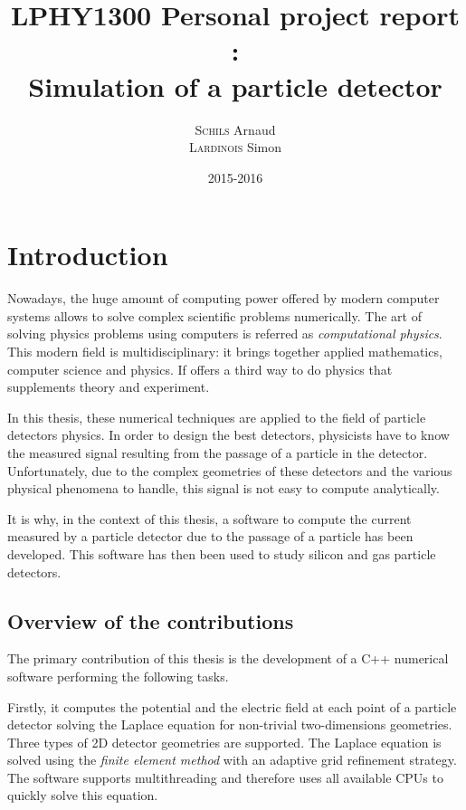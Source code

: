 \documentclass[11pt]{article}
\title{LPHY1300 Personal project report :\\ Simulation of a particle detector}
\author{\textsc{Schils} Arnaud\\ \textsc{Lardinois} Simon}
\date{2015-2016}
\begin{document}
\maketitle
\newpage
\renewcommand{\contentsname}{Table of contents}
\tableofcontents




\newpage
\section*{Introduction}

Nowadays, the huge amount of computing power offered by modern computer systems allows
to solve complex scientific problems numerically. The art of solving physics problems using
computers is referred as \textit{computational physics}. This modern field
is multidisciplinary: it brings together applied mathematics,
computer science and physics. If offers a third way to do physics
that supplements theory and experiment.

In this thesis, these numerical techniques are applied to the field of particle
detectors physics. In order to design the best detectors,
physicists have to know the measured signal resulting from the passage of a particle
in the detector. Unfortunately, due to the complex geometries of these detectors
and the various physical phenomena to handle, this signal is not easy
to compute analytically.

It is why, in the context of this thesis, a software  to compute the current measured
by a particle detector due to the passage of a particle has been developed.
This software has then been used to study silicon and gas particle detectors.


	\subsection*{Overview of the contributions}

	The primary contribution of this thesis is the development of a C++ numerical software performing the
	following tasks.

	Firstly, it computes the potential and the electric field
	at each point of a particle detector solving the Laplace equation for non-trivial
	two-dimensions geometries. Three types of 2D detector geometries are supported.
	The Laplace equation is solved using the \textit{finite element method} with an adaptive
	grid refinement strategy. The software supports multithreading and therefore
	uses all available CPUs to quickly solve this equation.
\end{document}
